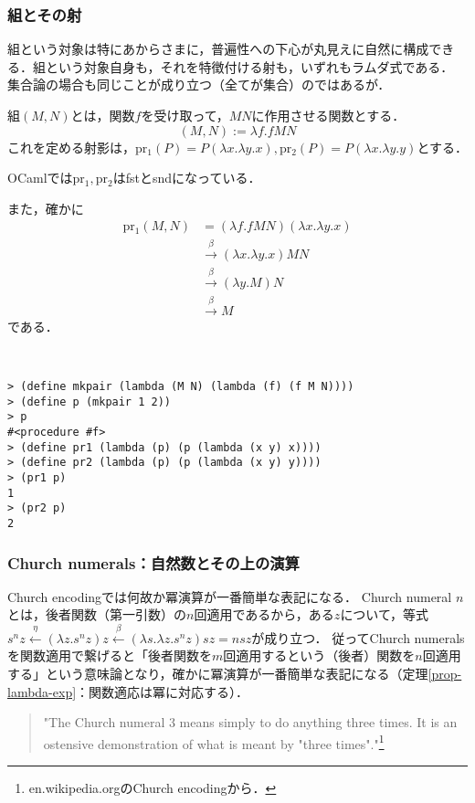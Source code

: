 \documentclass[uplatex, 12pt, dvipdfmx]{jsreport}
\begin{document}
\subsubsection{組とその射}
組という対象は特にあからさまに，普遍性への下心が丸見えに自然に構成できる．組という対象自身も，それを特徴付ける射も，いずれもラムダ式である．
集合論の場合も同じことが成り立つ（全てが集合）のではあるが．

\begin{shadebox}\begin{definition}[tuple]
    組$(M,N)$とは，関数$f$を受け取って，$MN$に作用させる関数とする．
    \[ (M,N):=\lambda f.fMN \]
    これを定める射影は，$\mathrm{pr_1}(P)=P(\lambda x.\lambda y.x), \mathrm{pr_2}(P)=P(\lambda x.\lambda y.y)$とする．
\end{definition}\end{shadebox}
\begin{remark}
    OCamlでは$\mathrm{pr_1,pr_2}$はfstとsndになっている．

    また，確かに
    \begin{align*}
        \mathrm{pr_1}(M,N) &= (\lambda f.fMN)(\lambda x.\lambda y.x) \\
        &\xrightarrow{\beta} (\lambda x.\lambda y.x) MN \\
        &\xrightarrow{\beta} (\lambda y.M)N \\
        &\xrightarrow{\beta} M
    \end{align*}
    である．
\end{remark}

\begin{example}[Scheme]　
    
\begin{lstlisting}
> (define mkpair (lambda (M N) (lambda (f) (f M N))))
> (define p (mkpair 1 2))
> p
#<procedure #f>
> (define pr1 (lambda (p) (p (lambda (x y) x))))
> (define pr2 (lambda (p) (p (lambda (x y) y))))
> (pr1 p)
1
> (pr2 p)
2
\end{lstlisting}
\end{example}

\subsubsection{Church numerals：自然数とその上の演算}
Church encodingでは何故か冪演算が一番簡単な表記になる．
Church numeral $n$とは，後者関数（第一引数）の$n$回適用であるから，ある$z$について，等式$s^nz\xleftarrow{\eta}(\lambda z.s^nz)z\xleftarrow{\beta}(\lambda s.\lambda z.s^nz)sz=nsz$が成り立つ．
従ってChurch numeralsを関数適用で繋げると「後者関数を$m$回適用するという（後者）関数を$n$回適用する」という意味論となり，確かに冪演算が一番簡単な表記になる（定理\ref{prop-lambda-exp}：関数適応は冪に対応する）．
\begin{quote}
    "The Church numeral 3 means simply to do anything three times. It is an ostensive demonstration of what is meant by "three times"."\footnote{en.wikipedia.orgのChurch encodingから．}
\end{quote}
\end{document}
